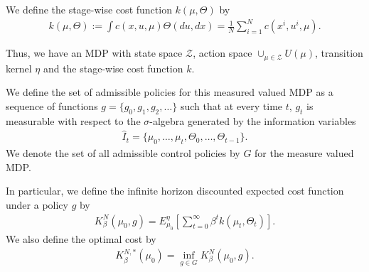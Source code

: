 \documentclass[twoside,11pt]{article}
\def\P{{\mathcal P}}
\newcommand{\adk}[1]{{\color{red} #1}}
\begin{document}
We define the stage-wise cost function $k(\mu,\Theta)$ by
\begin{align}\label{cost_measure}
k(\mu,\Theta):=\int c(x,u,\mu)\Theta(du,dx)=\frac{1}{N}\sum_{i=1}^Nc(x^i,u^i,\mu).%
\end{align}




Thus, we have an MDP with state space $\mathcal{Z}$, action space $\cup_{\mu\in\mathcal{Z}}U(\mu)$, transition kernel $\eta$ and the stage-wise cost function $k$.

We define the set of admissible policies for this measured valued MDP as a sequence of functions $g=\{g_0,g_1,g_2,\dots\}$ such that at every time $t$, $g_t$ is measurable with respect to the $\sigma$-algebra generated by the information variables
\begin{align*}
\hat{I}_t=\{\mu_0,\dots,\mu_t,\Theta_0,\dots,\Theta_{t-1}\}.
\end{align*}
We denote the set of all admissible control policies by $G$ for the measure valued MDP.

In particular, we define the infinite horizon discounted expected cost function under a policy $g$ by
\begin{align*}
K^N_\beta(\mu_0,g)=E_{\mu_0}^\eta\left[ \sum_{t=0}^{\infty}\beta^tk(\mu_t,\Theta_t)\right].
\end{align*}
We also define the optimal cost by
\begin{align}\label{opt_cost2}
K_\beta^{N,*}(\mu_0)=\inf_{g\in G}K^N_\beta(\mu_0,g).
\end{align}
\end{document}
